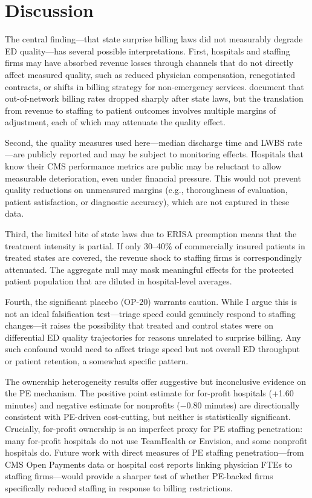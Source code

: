 \documentclass[12pt]{article}
\begin{document}
\section{Discussion}
\label{sec:discussion}

The central finding---that state surprise billing laws did not measurably degrade ED quality---has several possible interpretations. First, hospitals and staffing firms may have absorbed revenue losses through channels that do not directly affect measured quality, such as reduced physician compensation, renegotiated contracts, or shifts in billing strategy for non-emergency services. \citet{cooperFiscella2024} document that out-of-network billing rates dropped sharply after state laws, but the translation from revenue to staffing to patient outcomes involves multiple margins of adjustment, each of which may attenuate the quality effect.

Second, the quality measures used here---median discharge time and LWBS rate---are publicly reported and may be subject to monitoring effects. Hospitals that know their CMS performance metrics are public may be reluctant to allow measurable deterioration, even under financial pressure. This would not prevent quality reductions on unmeasured margins (e.g., thoroughness of evaluation, patient satisfaction, or diagnostic accuracy), which are not captured in these data.

Third, the limited bite of state laws due to ERISA preemption means that the treatment intensity is partial. If only 30--40\% of commercially insured patients in treated states are covered, the revenue shock to staffing firms is correspondingly attenuated. The aggregate null may mask meaningful effects for the protected patient population that are diluted in hospital-level averages.

Fourth, the significant placebo (OP-20) warrants caution. While I argue this is not an ideal falsification test---triage speed could genuinely respond to staffing changes---it raises the possibility that treated and control states were on differential ED quality trajectories for reasons unrelated to surprise billing. Any such confound would need to affect triage speed but not overall ED throughput or patient retention, a somewhat specific pattern.

The ownership heterogeneity results offer suggestive but inconclusive evidence on the PE mechanism. The positive point estimate for for-profit hospitals (+1.60 minutes) and negative estimate for nonprofits ($-0.80$ minutes) are directionally consistent with PE-driven cost-cutting, but neither is statistically significant. Crucially, for-profit ownership is an imperfect proxy for PE staffing penetration: many for-profit hospitals do not use TeamHealth or Envision, and some nonprofit hospitals do. Future work with direct measures of PE staffing penetration---from CMS Open Payments data or hospital cost reports linking physician FTEs to staffing firms---would provide a sharper test of whether PE-backed firms specifically reduced staffing in response to billing restrictions.
\end{document}
